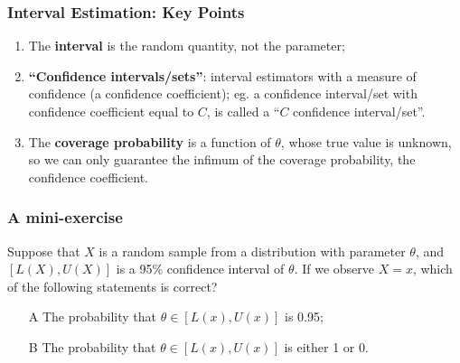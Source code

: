 \documentclass{beamer}
\begin{document}
\begin{frame}
\frametitle{Interval Estimation: Key Points}
\begin{enumerate}
\item The \textbf{interval} is the random quantity, not the parameter; 
\item \textbf{``Confidence intervals/sets''}: interval estimators with a measure of confidence (a confidence coefficient); eg. a confidence interval/set with confidence coefficient equal to $C$, is called a ``$C$ confidence interval/set''.
\item The \textbf{coverage probability} is a function of $\theta$, whose true value is unknown, so we can only guarantee the infimum of the coverage probability, the confidence coefficient.
\end{enumerate}
\end{frame}

\begin{frame}
\frametitle{A mini-exercise}
Suppose that $X$ is a random sample from a distribution with parameter $\theta$, and $[L(X),U(X)]$ is a 95\% confidence interval of $\theta$. If we observe $X=x$, which of the following statements is correct?
\begin{itemize}
\item[A] The probability that $\theta \in [L(x),U(x)]$ is 0.95;
\item[B] The probability that $\theta \in [L(x),U(x)]$ is either 1 or 0.
\end{itemize}
\end{frame}

\end{document}
